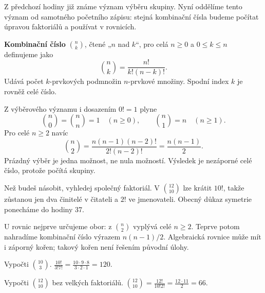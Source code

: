 \documentclass[11pt,a4paper]{article}
\begin{document}
Z předchozí hodiny již známe význam výběru skupiny. Nyní oddělíme tento význam od samotného početního zápisu: stejná kombinační čísla budeme počítat úpravou faktoriálů a používat v rovnicích.

\begin{definiceBox}
\textbf{Kombinační číslo} $\binom nk$, čtené „$n$ nad $k$“, pro celá $n\geq0$ a $0\leq k\leq n$ definujeme jako
\[
 \binom nk=\frac{n!}{k!(n-k)!}.
\]
Udává počet $k$-prvkových podmnožin $n$-prvkové množiny. Spodní index $k$ je rovněž celé číslo.
\end{definiceBox}

Z výběrového významu i dosazením $0!=1$ plyne
\[
 \binom n0=\binom nn=1\quad(n\geq0),\qquad
 \binom n1=n\quad(n\geq1).
\]
Pro celé $n\geq2$ navíc
\[
 \binom n2=\frac{n(n-1)(n-2)!}{2!(n-2)!}=\frac{n(n-1)}2.
\]
Prázdný výběr je jedna možnost, ne nula možností. Výsledek je nezáporné celé číslo, protože počítá skupiny.

Než budeš násobit, vyhledej společný faktoriál. V $\binom{12}{10}$ lze krátit $10!$, takže zůstanou jen dva činitelé v čitateli a $2!$ ve jmenovateli. Obecný důkaz symetrie ponecháme do hodiny 37.

U rovnic nejprve určujeme obor: z $\binom n2$ vyplývá celé $n\geq2$. Teprve potom nahradíme kombinační číslo výrazem $n(n-1)/2$. Algebraická rovnice může mít i záporný kořen; takový kořen není řešením původní úlohy.




\begin{prikladReseniBox}[title={Příklad P1}]
Vypočti \(\binom{10}{3}\).
\tcblower
\(\frac{10!}{3!7!}=\frac{10\cdot9\cdot8}{3\cdot2\cdot1}=120\).
\end{prikladReseniBox}


\begin{prikladReseniBox}[title={Příklad P2}]
Vypočti \(\binom{12}{10}\) bez velkých faktoriálů.
\tcblower
\(\binom{12}{10}=\frac{12!}{10!2!}=\frac{12\cdot11}{2}=66\).
\end{prikladReseniBox}
\end{document}

